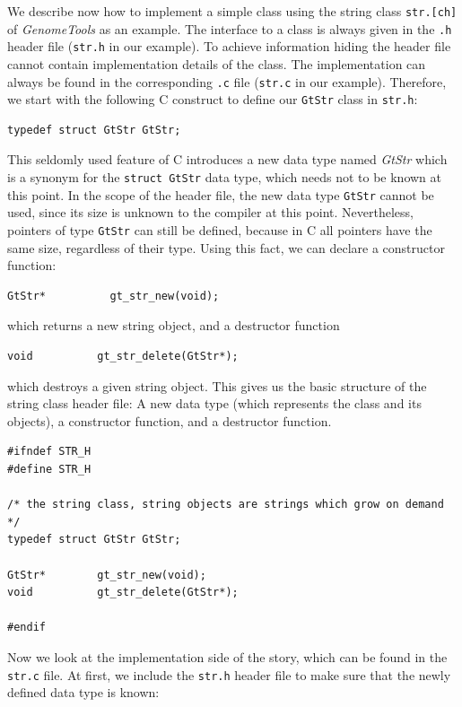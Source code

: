 \documentclass[11pt,final]{article}
\newcommand{\classname}[1]{\emph{#1}}
\newcommand{\keyword}[1]{\lstinline{#1}}
\newcommand{\Gt}[0]{\emph{GenomeTools}\xspace}
\begin{document}
We describe now how to implement a simple class using the string class
\keyword{str.[ch]} of \Gt as an example. The interface to a class is always
given in the \keyword{.h} header file (\keyword{str.h} in our example). To
achieve information hiding the header file cannot contain implementation details
of the class. The implementation can always be found in the corresponding
\keyword{.c} file (\keyword{str.c} in our example). Therefore, we start with
the following C construct to define our \keyword{GtStr} class in
\keyword{str.h}:

\begin{lstlisting}
typedef struct GtStr GtStr;
\end{lstlisting}

This seldomly used feature of C introduces a new data type named
\classname{GtStr} which is a synonym for the \keyword{struct GtStr} data type,
which needs not to be known at this point. In the scope of the header file, the
new data type \keyword{GtStr} cannot be used, since its size is unknown to the
compiler at this point. Nevertheless, pointers of type \keyword{GtStr} can still
be defined, because in C all pointers have the same size, regardless of their
type. Using this fact, we can declare a constructor function:

\begin{lstlisting}
GtStr*          gt_str_new(void);
\end{lstlisting}

which returns a new string object, and a destructor function

\begin{lstlisting}
void          gt_str_delete(GtStr*);
\end{lstlisting}

which destroys a given string object. This gives us the basic structure of the
string class header file: A new data type (which represents the class and its
objects), a constructor function, and a destructor function.

\begin{lstlisting}
#ifndef STR_H
#define STR_H

/* the string class, string objects are strings which grow on demand */
typedef struct GtStr GtStr;

GtStr*        gt_str_new(void);
void          gt_str_delete(GtStr*);

#endif
\end{lstlisting}

Now we look at the implementation side of the story, which can be found in the
\keyword{str.c} file. At first, we include the \keyword{str.h} header file to
make sure that the newly defined data type is known:
\end{document}
